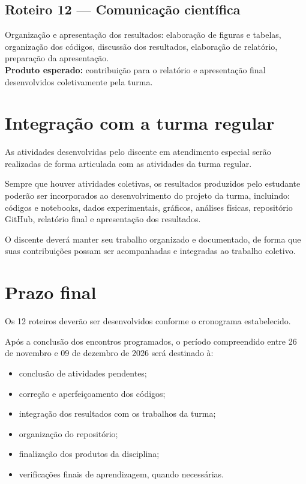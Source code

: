 \documentclass[11pt,a4paper]{article}
\begin{document}
\subsection*{Roteiro 12 --- Comunicação científica}
Organização e apresentação dos resultados: elaboração de figuras e tabelas, organização dos códigos, discussão dos resultados, elaboração de relatório, preparação da apresentação.\\
\textbf{Produto esperado:} contribuição para o relatório e apresentação final desenvolvidos coletivamente pela turma.

\section{Integração com a turma regular}
As atividades desenvolvidas pelo discente em atendimento especial serão realizadas de forma articulada com as atividades da turma regular.

Sempre que houver atividades coletivas, os resultados produzidos pelo estudante poderão ser incorporados ao desenvolvimento do projeto da turma, incluindo: códigos e notebooks, dados experimentais, gráficos, análises físicas, repositório GitHub, relatório final e apresentação dos resultados.

O discente deverá manter seu trabalho organizado e documentado, de forma que suas contribuições possam ser acompanhadas e integradas ao trabalho coletivo.

\section{Prazo final}
Os 12 roteiros deverão ser desenvolvidos conforme o cronograma estabelecido.

Após a conclusão dos encontros programados, o período compreendido entre 26 de novembro e 09 de dezembro de 2026 será destinado à:
\begin{itemize}
    \item conclusão de atividades pendentes;
    \item correção e aperfeiçoamento dos códigos;
    \item integração dos resultados com os trabalhos da turma;
    \item organização do repositório;
    \item finalização dos produtos da disciplina;
    \item verificações finais de aprendizagem, quando necessárias.
\end{itemize}
\end{document}
